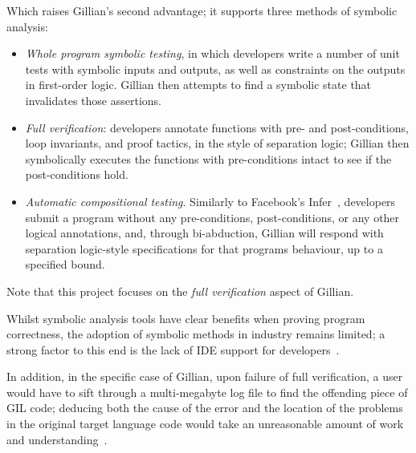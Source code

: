 Which raises Gillian's second advantage; it supports three methods of symbolic
analysis:
\begin{itemize}
  \item \emph{Whole program symbolic testing}, in which developers write a
  number of unit tests with symbolic inputs and outputs, as well as constraints
  on the outputs in first-order logic. Gillian then attempts to find a symbolic
  state that invalidates those assertions.

  \item \emph{Full verification}: developers annotate functions with pre- and
  post-conditions, loop invariants, and proof tactics, in the style of
  separation logic; Gillian then symbolically executes the functions with
  pre-conditions intact to see if the post-conditions hold.

  \item \emph{Automatic compositional testing}. Similarly to Facebook's
  Infer~\cite{infer, infer-site}, developers submit a program without any
  pre-conditions, post-conditions, or any other logical annotations, and,
  through bi-abduction\cite{bi-abduction}, Gillian will respond with
  separation logic-style specifications for that programs behaviour, up
  to a specified bound.
\end{itemize}

Note that this project focuses on the \textit{full verification} aspect of
Gillian.


Whilst symbolic analysis tools have clear benefits when proving program
correctness, the adoption of symbolic methods in industry remains limited; a
strong factor to this end is the lack of IDE support for
developers~\cite{magpiebridge}.

In addition, in the specific case of Gillian, upon failure of full
verification, a user would have to sift through a multi-megabyte log file to
find the offending piece of GIL code; deducing both the cause of the error and
the location of the problems in the original target language code would take an
unreasonable amount of work and understanding~\cite{gillian-debugging-2021}.

